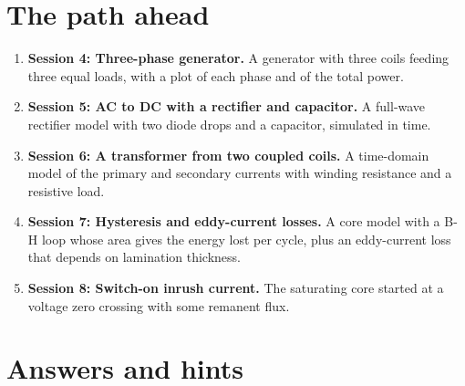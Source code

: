 \documentclass[11pt,a4paper]{article}
\begin{document}
\section{The path ahead}
\begin{enumerate}[nosep]
\item \textbf{Session 4: Three-phase generator.} A generator with three coils feeding three equal loads, with a plot of each phase and of the total power.
\item \textbf{Session 5: AC to DC with a rectifier and capacitor.} A full-wave rectifier model with two diode drops and a capacitor, simulated in time.
\item \textbf{Session 6: A transformer from two coupled coils.} A time-domain model of the primary and secondary currents with winding resistance and a resistive load.
\item \textbf{Session 7: Hysteresis and eddy-current losses.} A core model with a B-H loop whose area gives the energy lost per cycle, plus an eddy-current loss that depends on lamination thickness.
\item \textbf{Session 8: Switch-on inrush current.} The saturating core started at a voltage zero crossing with some remanent flux.
\end{enumerate}

\section{Answers and hints}
\end{document}
